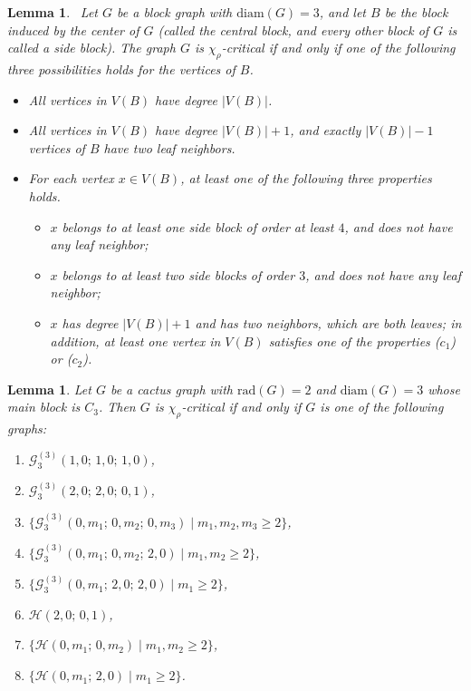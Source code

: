 \documentclass[12pt]{article}
\newtheorem{lemma}[theorem]{Lemma}
\begin{document}
\begin{lemma}~{\rm \cite{bresar-2022}}\label{lemma8}
	Let $G$ be a block graph with $\mathrm{diam}(G) = 3$, and let $B$ be the block induced by the center of $G$ (called the central block, and every other block of $G$ is called a side block). The graph $G$ is $\chi_\rho$-critical if and only if one of the following three possibilities holds for the vertices of $B$.
    \begin{itemize}
	    \item[($a$)] All vertices in $V(B)$ have degree $|V(B)|$.
	
	\item[($b$)] All vertices in $V(B)$ have degree $|V(B)|+1$, and exactly $|V(B)|-1$ vertices of $B$ have two leaf neighbors.
	
	\item[($c$)] For each vertex $x \in V(B)$, at least one of the following three properties holds.

    \begin{itemize}
        \item[($c_1$)] $x$ belongs to at least one side block of order at least $4$, and does not have any leaf neighbor;
	
	\item[($c_2$)] $x$ belongs to at least two side blocks of order $3$, and does not have any leaf neighbor;
	
	\item[($c_3$)] $x$ has degree $|V(B)|+1$ and has two neighbors, which are both leaves; in addition, at least one vertex in $V(B)$ satisfies one of the properties ($c_1$) or ($c_2$).
    \end{itemize}
	\end{itemize}
\end{lemma}

\begin{lemma}\label{teo1}
Let $G$ be a cactus graph with $\mathrm{rad}(G) = 2$  and  $\mathrm{diam}(G) = 3$ whose main block is $C_{3}$. 
Then $G$ is $\chi_\rho$-critical if and only if $G$ is one of the following graphs:
\begin{enumerate}[label=(\roman*)]
\item $\mathcal{G}_{3}^{(3)}(1,0;\,1,0;\,1,0)$,
\item $\mathcal{G}_{3}^{(3)}(2,0;\,2,0;\,0,1)$,
\item $\{\mathcal{G}_{3}^{(3)}(0,m_{1};\,0,m_{2};\,0,m_{3}) \mid m_{1},m_{2},m_{3}\ge 2\}$,
\item $\{\mathcal{G}_{3}^{(3)}(0,m_{1};\,0,m_{2};\,2,0) \mid m_{1},m_{2}\ge 2\}$,
\item $\{\mathcal{G}_{3}^{(3)}(0,m_{1};\,2,0;\,2,0) \mid m_{1}\ge 2\}$,
\item $\mathcal{H}(2,0;\,0,1)$,
\item $\{\mathcal{H}(0,m_{1};\,0,m_{2}) \mid m_{1},m_{2}\ge 2\}$,
\item $\{\mathcal{H}(0,m_{1};\,2,0) \mid m_{1}\ge 2\}$.
\end{enumerate}
\end{lemma}
\end{document}
